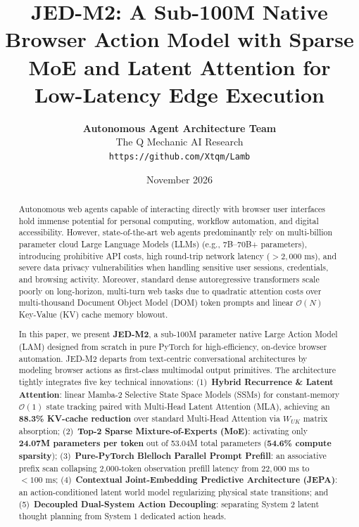 \documentclass[10pt,twocolumn,letterpaper]{article}
\title{\textbf{JED-M2: A Sub-100M Native Browser Action Model with Sparse MoE and Latent Attention for Low-Latency Edge Execution}}
\author{
  \textbf{Autonomous Agent Architecture Team} \\
  The Q Mechanic AI Research \\
  \texttt{https://github.com/Xtqm/Lamb}
}
\date{November 2026}
\begin{document}
\maketitle

\begin{abstract}
Autonomous web agents capable of interacting directly with browser user interfaces hold immense potential for personal computing, workflow automation, and digital accessibility. However, state-of-the-art web agents predominantly rely on multi-billion parameter cloud Large Language Models (LLMs) (e.g., 7B--70B+ parameters), introducing prohibitive API costs, high round-trip network latency ($> 2{,}000\text{ ms}$), and severe data privacy vulnerabilities when handling sensitive user sessions, credentials, and browsing activity. Moreover, standard dense autoregressive transformers scale poorly on long-horizon, multi-turn web tasks due to quadratic attention costs over multi-thousand Document Object Model (DOM) token prompts and linear $\mathcal{O}(N)$ Key-Value (KV) cache memory blowout.

In this paper, we present \textbf{JED-M2}, a sub-100M parameter native Large Action Model (LAM) designed from scratch in pure PyTorch for high-efficiency, on-device browser automation. JED-M2 departs from text-centric conversational architectures by modeling browser actions as first-class multimodal output primitives. The architecture tightly integrates five key technical innovations: (1)~\textbf{Hybrid Recurrence \& Latent Attention}: linear Mamba-2 Selective State Space Models (SSMs) for constant-memory $\mathcal{O}(1)$ state tracking paired with Multi-Head Latent Attention (MLA), achieving an \textbf{88.3\% KV-cache reduction} over standard Multi-Head Attention via $W_{UK}$ matrix absorption; (2)~\textbf{Top-2 Sparse Mixture-of-Experts (MoE)}: activating only \textbf{24.07M parameters per token} out of 53.04M total parameters (\textbf{54.6\% compute sparsity}); (3)~\textbf{Pure-PyTorch Blelloch Parallel Prompt Prefill}: an associative prefix scan collapsing 2,000-token observation prefill latency from $22{,}000\text{ ms}$ to \textbf{$< 100\text{ ms}$}; (4)~\textbf{Contextual Joint-Embedding Predictive Architecture (JEPA)}: an action-conditioned latent world model regularizing physical state transitions; and (5)~\textbf{Decoupled Dual-System Action Decoupling}: separating System 2 latent thought planning from System 1 dedicated action heads.


\end{abstract}
\end{document}
